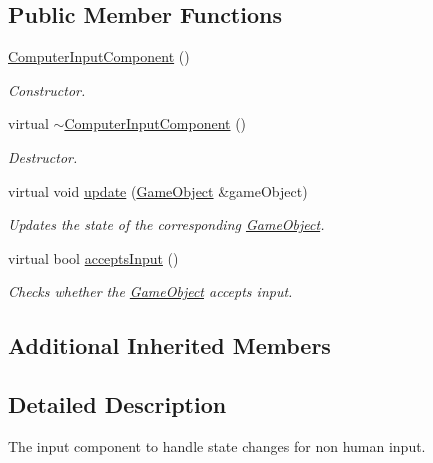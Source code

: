 \subsection*{Public Member Functions}
\begin{DoxyCompactItemize}
\item 
\hypertarget{classComputerInputComponent_a9fe5c3b8e0c08f505856828d45d941b2}{\hyperlink{classComputerInputComponent_a9fe5c3b8e0c08f505856828d45d941b2}{Computer\-Input\-Component} ()}\label{classComputerInputComponent_a9fe5c3b8e0c08f505856828d45d941b2}

\begin{DoxyCompactList}\small\item\em Constructor. \end{DoxyCompactList}\item 
\hypertarget{classComputerInputComponent_a58e35dc2bcec2ee35fdca85b25f9dbf0}{virtual \hyperlink{classComputerInputComponent_a58e35dc2bcec2ee35fdca85b25f9dbf0}{$\sim$\-Computer\-Input\-Component} ()}\label{classComputerInputComponent_a58e35dc2bcec2ee35fdca85b25f9dbf0}

\begin{DoxyCompactList}\small\item\em Destructor. \end{DoxyCompactList}\item 
virtual void \hyperlink{classComputerInputComponent_abddd2bdc7efb465f49173a3634148bbc}{update} (\hyperlink{classGameObject}{Game\-Object} \&game\-Object)
\begin{DoxyCompactList}\small\item\em Updates the state of the corresponding \hyperlink{classGameObject}{Game\-Object}. \end{DoxyCompactList}\item 
virtual bool \hyperlink{classComputerInputComponent_a20fda9adf00a1be24b9bcca0b8662a35}{accepts\-Input} ()
\begin{DoxyCompactList}\small\item\em Checks whether the \hyperlink{classGameObject}{Game\-Object} accepts input. \end{DoxyCompactList}\end{DoxyCompactItemize}
\subsection*{Additional Inherited Members}


\subsection{Detailed Description}
The input component to handle state changes for non human input. 

